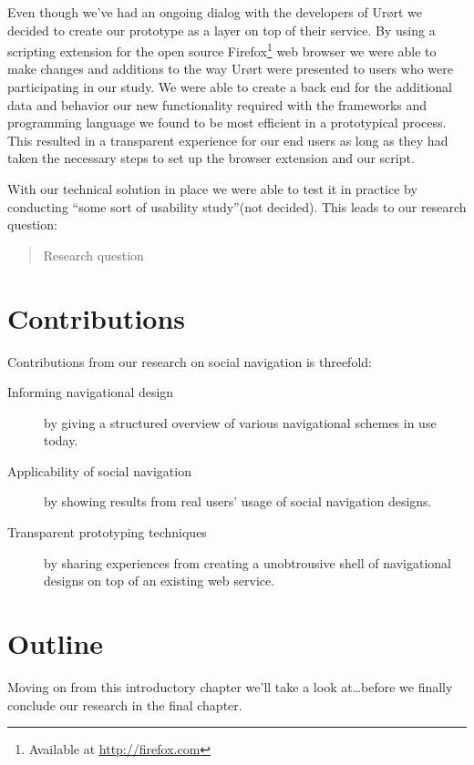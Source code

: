 Even though we've had an ongoing dialog with the developers of Ur\o{}rt we
decided to create our prototype as a layer on top of their service. By using a
scripting extension for the open source
Firefox\footnote{Available at \url{http://firefox.com}}
web browser we were able to make changes and additions to the way Ur\o{}rt were
presented to users who were participating in our study. We were able to create
a back end for the additional data and behavior our new functionality required
with the frameworks and programming language we found to be most efficient in
a prototypical process. This resulted in a transparent experience for our end
users as long as they had taken the necessary steps to set up the browser
extension and our script.

With our technical solution in place we were able to test it in practice by
conducting ``some sort of usability study''(not decided). This leads to our
research question:


\begin{quote}
  Research question
\end{quote}

\section{Contributions}

Contributions from our research on social navigation is threefold:

\begin{description}
  \item[Informing navigational design] by giving a structured overview of
    various navigational schemes in use today.
  \item[Applicability of social navigation] by showing results from real
    users' usage of social navigation designs.
  \item[Transparent prototyping techniques] by sharing experiences from
    creating a unobtrousive shell of navigational designs on top of an
    existing web service.
\end{description}

\section{Outline}

Moving on from this introductory chapter we'll take a look at\ldots before we
finally conclude our research in the final chapter.

